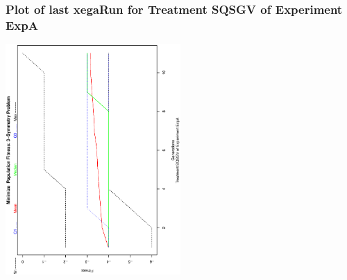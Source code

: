  \begin{frame}
 \frametitle{ Plot of last xegaRun for Treatment SQSGV of Experiment ExpA }
 \begin{center}
\includegraphics[width=0.5\textwidth, angle=-90]
{ExpAPlotPopStatsFigure005.eps}
 \end{center}
 \label{report/ExpAPlotPopStatsFigure005.eps}  
 \end{frame}

